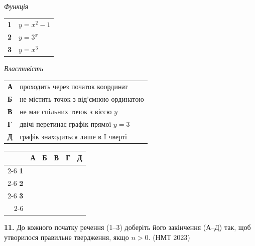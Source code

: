 \documentclass[14pt]{extarticle}
\newcommand{\answerGrid}{
    \begingroup
    \setlength{\tabcolsep}{4pt}
    \renewcommand{\arraystretch}{1.2}
    \small
    \begin{tabular}{r|c|c|c|c|c|}
         \multicolumn{1}{c}{} & \multicolumn{1}{c}{\textbf{А}} & \multicolumn{1}{c}{\textbf{Б}} & \multicolumn{1}{c}{\textbf{В}} & \multicolumn{1}{c}{\textbf{Г}} & \multicolumn{1}{c}{\textbf{Д}} \\ \cline{2-6}
         \textbf{1} & & & & & \\ \cline{2-6}
         \textbf{2} & & & & & \\ \cline{2-6}
         \textbf{3} & & & & & \\ \cline{2-6}
    \end{tabular}
    \endgroup
}
\newcommand{\nmtyear}[1]{\hfill{\small\color{yearcolor}(НМТ #1)}}
\begin{document}
\noindent
\begin{minipage}[t]{0.45\textwidth}
    \textit{Функція} \par \vspace{0.2cm}
    \begin{tabular}{@{}p{0.5cm} l@{}}
    \textbf{1} & $y = x^2 - 1$ \\[0.4cm]
    \textbf{2} & \colorbox{yellow!30}{$y = 3^x$} \\[0.4cm]
    \textbf{3} & $y = x^3$ \\
    \end{tabular}
\end{minipage}%
\hfill
\begin{minipage}[t]{0.50\textwidth}
    \textit{Властивість} \par \vspace{0.2cm}
    \begin{tabular}{@{}p{0.5cm} p{7cm}@{}}
    \textbf{А} & проходить через початок координат \\[0.2cm]
    \textbf{Б} & не містить точок з від'ємною ординатою \\[0.2cm]
    \textbf{В} & не має спільних точок з віссю $y$ \\[0.2cm]
    \textbf{Г} & двічі перетинає графік прямої $y = 3$ \\[0.2cm]
    \textbf{Д} & графік знаходиться лише в I чверті \\
    \end{tabular}
\end{minipage}
\vspace{0.3cm}

\answerGrid
\vspace{0.7cm}

\noindent\textbf{11.} До кожного початку речення (1–3) доберіть його закінчення (А–Д) так, щоб утворилося правильне твердження, якщо $n > 0$. \nmtyear{2023}
\vspace{0.3cm}
\end{document}
